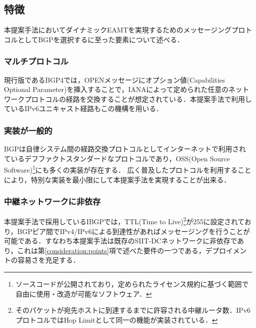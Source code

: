 {\subsection{特徴}
本提案手法においてダイナミックEAMTを実現するためのメッセージングプロトコルとしてBGPを選択するに至った要素について述べる．

\subsubsection{マルチプロトコル}
現行版であるBGP4では，OPENメッセージにオプション値(Capabilities Optional Parameter)を挿入することで，IANAによって定められた任意のネットワークプロトコル\cite{IANA_AFI,IANA_SAFI}の経路を交換することが想定されている\cite{RFC4760}．本提案手法で利用しているIPv6ユニキャスト経路もこの機構を用いる．


\subsubsection{実装が一般的}
BGPは自律システム間の経路交換プロトコルとしてインターネットで利用されているデフファクトスタンダードなプロトコルであり，OSS(Open Source Software)\footnote{ソースコードが公開されており，定められたライセンス規約に基づく範囲で自由に使用・改造が可能なソフトウェア．}にも多くの実装が存在する．
広く普及したプロトコルを利用することにより，特別な実装を最小限にして本提案手法を実現することが出来る．

\subsubsection{中継ネットワークに非依存}
本提案手法で採用しているIBGPでは，TTL(Time to Live)\footnote{そのパケットが宛先ホストに到達するまでに許容される中継ルータ数．IPv6プロトコルではHop Limitとして同一の機能が実装されている\cite{RFC8200}．}が255に設定されており，BGPピア間でIPv4/IPv6による到達性があればメッセージングを行うことが可能である．すなわち本提案手法は既存のSIIT-DCネットワークに非依存であり，これは第\ref{consideration:points}項で述べた要件の一つである，デプロイメントの容易さを充足する．


}

